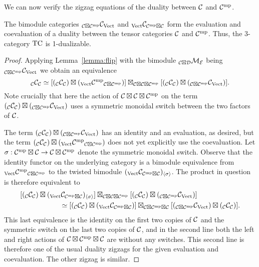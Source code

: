 \documentclass{amsart}
\begin{document}
We can now verify the zigzag equations of the duality between $\mathcal C$ and $\mathcal C^{\mathrm{mp}}$.
\begin{proposition} \label{prop:onedual}
The bimodule categories ${}_{\mathcal C \boxtimes \mathcal C^{\mathrm{mp}}} \mathcal C_{\mathrm{Vect}}$ and ${}_{\mathrm{Vect}} \mathcal C_{\mathcal C^{\mathrm{mp}} \boxtimes \mathcal C}$ form the evaluation and coevaluation of a duality between the tensor categories $\mathcal C$ and $\mathcal C^{\mathrm{mp}}$.  Thus, the 3-category $\mathrm{TC}$ is 1-dualizable.
\end{proposition}
\begin{proof}
Applying Lemma~\ref{lemma:flip} with the bimodule ${}_{\mathcal C \boxtimes \mathcal D} \mathcal M_\mathcal E$ being ${}_{\mathcal C \boxtimes \mathcal C^{\mathrm{mp}}} \mathcal C_{\mathrm{Vect}}$ we obtain an equivalence
\[
{}_\mathcal C \mathcal C_\mathcal C
\simeq
[({}_\mathcal C \mathcal C_\mathcal C) \boxtimes ({}_{\mathrm{Vect}} {\mathcal C^{\mathrm{mp}}}_{\mathcal C \boxtimes \mathcal C^{\mathrm{mp}}})] \boxtimes_{\mathcal C \boxtimes \mathcal C \boxtimes \mathcal C^{\mathrm{mp}}} [({}_\mathcal C \mathcal C_\mathcal C) \boxtimes ({}_{\mathcal C \boxtimes \mathcal C^{\mathrm{mp}}} \mathcal C_{\mathrm{Vect}})].
\]
Note crucially that here the action of $\mathcal C \boxtimes \mathcal C \boxtimes \mathcal C^{\mathrm{mp}}$ on the term $({}_\mathcal C \mathcal C_\mathcal C) \boxtimes ({}_{\mathcal C \boxtimes \mathcal C^{\mathrm{mp}}} \mathcal C_{\mathrm{Vect}})$ uses a symmetric monoidal switch between the two factors of $\mathcal C$.  

The term $({}_\mathcal C \mathcal C_\mathcal C) \boxtimes ({}_{\mathcal C \boxtimes \mathcal C^{\mathrm{mp}}} \mathcal C_{\mathrm{Vect}})$ has an identity and an evaluation, as desired, but the term $({}_\mathcal C \mathcal C_\mathcal C) \boxtimes ({}_{\mathrm{Vect}} {\mathcal C^{\mathrm{mp}}}_{\mathcal C \boxtimes \mathcal C^{\mathrm{mp}}})$ does not yet explicitly use the coevaluation.  Let $\sigma: \mathcal C^{\mathrm{mp}} \boxtimes \mathcal C \rightarrow \mathcal C \boxtimes \mathcal C^{\mathrm{mp}}$ denote the symmetric monoidal switch.  Observe that the identity functor on the underlying category is a bimodule equivalence from  ${}_{\mathrm{Vect}} {\mathcal C^{\mathrm{mp}}}_{\mathcal C \boxtimes \mathcal C^{\mathrm{mp}}}$ to the twisted bimodule $({}_{\mathrm{Vect}} \mathcal C_{\mathcal C^{\mathrm{mp}} \boxtimes \mathcal C})_{\langle \sigma \rangle}$.  The product in question is therefore equivalent to
\begin{align*}
&[({}_\mathcal C \mathcal C_\mathcal C) \boxtimes ({}_{\mathrm{Vect}} {\mathcal C}_{\mathcal C^{\mathrm{mp}} \boxtimes \mathcal C})_{\langle \sigma \rangle}] \boxtimes_{\mathcal C \boxtimes \mathcal C \boxtimes \mathcal C^{\mathrm{mp}}} [({}_\mathcal C \mathcal C_\mathcal C) \boxtimes ({}_{\mathcal C \boxtimes \mathcal C^{\mathrm{mp}}} \mathcal C_{\mathrm{Vect}})] \\
& \hspace{2cm} \simeq
[({}_\mathcal C \mathcal C_\mathcal C) \boxtimes ({}_{\mathrm{Vect}} {\mathcal C}_{\mathcal C^{\mathrm{mp}} \boxtimes \mathcal C})] \boxtimes_{\mathcal C \boxtimes \mathcal C^{\mathrm{mp}} \boxtimes \mathcal C} [({}_{\mathcal C \boxtimes \mathcal C^{\mathrm{mp}}} \mathcal C_{\mathrm{Vect}}) \boxtimes ({}_\mathcal C \mathcal C_\mathcal C)].
\end{align*}
This last equivalence is the identity on the first two copies of $\mathcal C$ and the symmetric switch on the last two copies of $\mathcal C$, and in the second line both the left and right actions of $\mathcal C \boxtimes \mathcal C^{\mathrm{mp}} \boxtimes \mathcal C$ are without any switches.  This second line is therefore one of the usual duality zigzags for the given evaluation and coevaluation.  The other zigzag is similar.
\end{proof}
\end{document}
